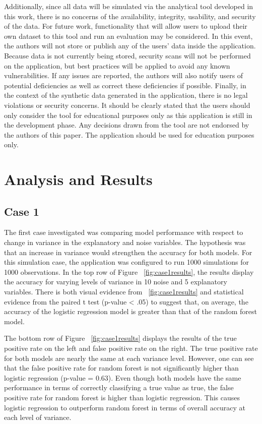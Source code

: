 \documentclass{llncs}
\begin{document}
Additionally, since all data will be simulated via the analytical tool developed in this work, there is no concerns of the availability, integrity, usability, and security of the data. For future work, functionality that will allow users to upload their own dataset to this tool and run an evaluation may be considered. In this event, the authors will not store or publish any of the users' data inside the application. Because data is not currently being stored, security scans will not be performed on the application, but best practices will be applied to avoid any known vulnerabilities. If any issues are reported, the authors will also notify users of potential deficiencies as well as correct these deficiencies if possible. Finally, in the context of the synthetic data generated in the application, there is no legal violations or security concerns. It should be clearly stated that the users should only consider the tool for educational purposes only as this application is still in the development phase. Any decisions drawn from the tool are not endorsed by the authors of this paper. The application should be used for education purposes only.  


\section{Analysis and Results}

\subsection{Case 1}

The first case investigated was comparing model performance with respect to change in variance in the explanatory and noise variables. The hypothesis was that an increase in variance would strengthen the accuracy for both models. For this simulation case, the application was configured to run 1000 simulations for 1000 observations. In the top row of Figure ~\ref{fig:case1results}, the results display the accuracy for varying levels of variance in 10 noise and 5 explanatory variables. There is both visual evidence from ~\ref{fig:case1results} and statistical evidence  from the paired t test (p-value < .05) to suggest that, on average, the accuracy of the logistic regression model is  greater than that of the random forest model. 

The bottom row of Figure ~\ref{fig:case1results} displays the results of the true positive rate on the left and false positive rate on the right. The true positive rate for both models are nearly the same at each variance level.  However, one can see that the false positive rate for random forest is not significantly higher than logistic regression (p-value = 0.63).  Even though both models have the same performance in terms of correctly classifying a true value as true, the false positive rate for random forest is higher than logistic regression.  This causes logistic regression to outperform random forest in terms of overall accuracy at each level of variance.
\end{document}
